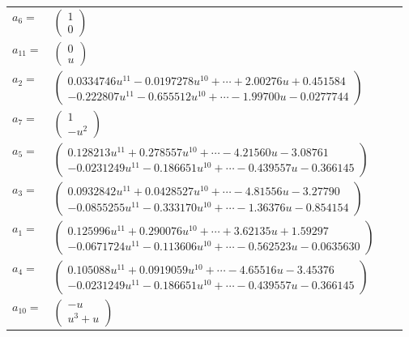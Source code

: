 \documentclass[1p]{elsarticle_modified}
\theoremstyle{definition}
\begin{document}
\begin{tabular}{m{7pt} m{180pt} m{7pt} m{180pt} }
\flushright $a_{6}=$&$\begin{pmatrix}1\\0\end{pmatrix}$ \\
\flushright $a_{11}=$&$\begin{pmatrix}0\\u\end{pmatrix}$ \\
\flushright $a_{2}=$&$\begin{pmatrix}0.0334746 u^{11}-0.0197278 u^{10}+\cdots+2.00276 u+0.451584\\-0.222807 u^{11}-0.655512 u^{10}+\cdots-1.99700 u-0.0277744\end{pmatrix}$ \\
\flushright $a_{7}=$&$\begin{pmatrix}1\\- u^2\end{pmatrix}$ \\
\flushright $a_{5}=$&$\begin{pmatrix}0.128213 u^{11}+0.278557 u^{10}+\cdots-4.21560 u-3.08761\\-0.0231249 u^{11}-0.186651 u^{10}+\cdots-0.439557 u-0.366145\end{pmatrix}$ \\
\flushright $a_{3}=$&$\begin{pmatrix}0.0932842 u^{11}+0.0428527 u^{10}+\cdots-4.81556 u-3.27790\\-0.0855255 u^{11}-0.333170 u^{10}+\cdots-1.36376 u-0.854154\end{pmatrix}$ \\
\flushright $a_{1}=$&$\begin{pmatrix}0.125996 u^{11}+0.290076 u^{10}+\cdots+3.62135 u+1.59297\\-0.0671724 u^{11}-0.113606 u^{10}+\cdots-0.562523 u-0.0635630\end{pmatrix}$ \\
\flushright $a_{4}=$&$\begin{pmatrix}0.105088 u^{11}+0.0919059 u^{10}+\cdots-4.65516 u-3.45376\\-0.0231249 u^{11}-0.186651 u^{10}+\cdots-0.439557 u-0.366145\end{pmatrix}$ \\
\flushright $a_{10}=$&$\begin{pmatrix}- u\\u^3+u\end{pmatrix}$ \\

\end{tabular}
\end{document}
